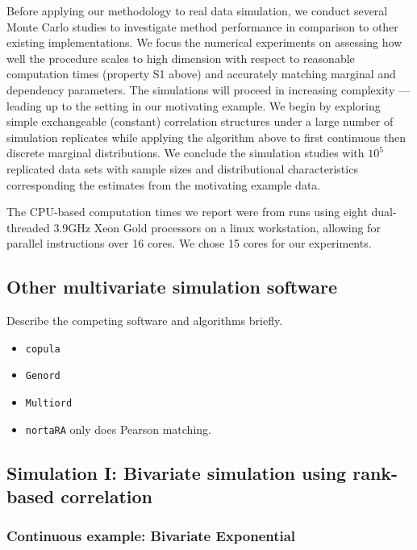 \documentclass[
]{article}
\providecommand{\tightlist}{%
  \setlength{\itemsep}{0pt}\setlength{\parskip}{0pt}}
\begin{document}
Before applying our methodology to real data simulation, we conduct several Monte Carlo studies to investigate method performance in comparison to other existing implementations. We focus the numerical experiments on assessing how well the procedure scales to high dimension with respect to reasonable computation times (property S1 above) and accurately matching marginal and dependency parameters. The simulations will proceed in increasing complexity --- leading up to the setting in our motivating example. We begin by exploring simple exchangeable (constant) correlation structures under a large number of simulation replicates while applying the algorithm above to first continuous then discrete marginal distributions. We conclude the simulation studies with \(10^5\) replicated data sets with sample sizes and distributional characteristics corresponding the estimates from the motivating example data.

The CPU-based computation times we report were from runs using eight dual-threaded 3.9GHz
Xeon Gold processors on a linux workstation, allowing for parallel instructions
over 16 cores. We chose 15 cores for our experiments.

\hypertarget{other-multivariate-simulation-software}{%
\subsection{Other multivariate simulation software}\label{other-multivariate-simulation-software}}

Describe the competing software and algorithms briefly.

\begin{itemize}
\tightlist
\item
  \texttt{copula}
\item
  \texttt{Genord}
\item
  \texttt{Multiord}
\item
  \texttt{nortaRA} only does Pearson matching.
\end{itemize}

\hypertarget{simulation-i-bivariate-simulation-using-rank-based-correlation}{%
\subsection{Simulation I: Bivariate simulation using rank-based correlation}\label{simulation-i-bivariate-simulation-using-rank-based-correlation}}

\hypertarget{continuous-example-bivariate-exponential}{%
\subsubsection{Continuous example: Bivariate Exponential}\label{continuous-example-bivariate-exponential}}
\end{document}
